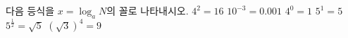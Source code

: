 다음 등식을 $x=\log_a N$의 꼴로 나타내시오.
 $4^2=16$
 $10^{-3}=0.001$
 $4^0=1$
 $5^1=5$
 $5^{\frac{1}{2}}=\sqrt{5}$
 $(\sqrt{3})^4=9$
